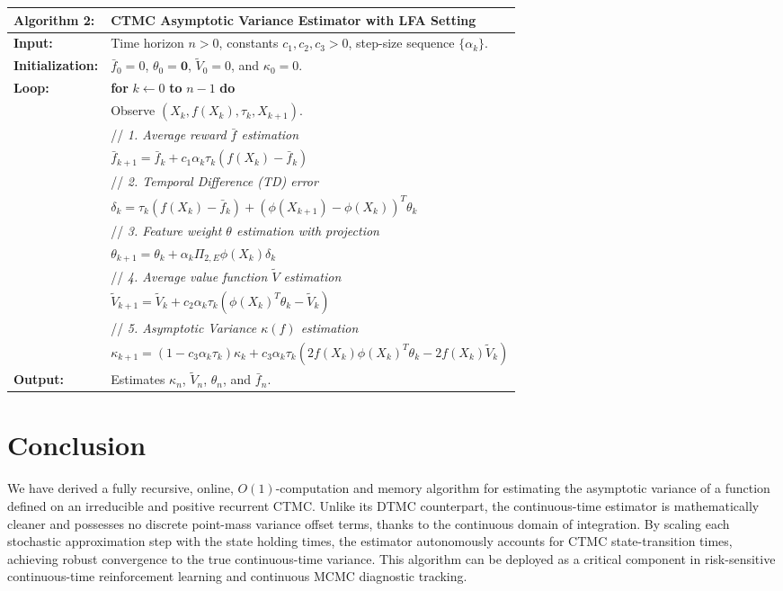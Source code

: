 \documentclass[11pt]{article}
\begin{document}
\begin{table}[H]
\centering
\begin{tabular}{lp{11cm}}
\toprule
\textbf{Algorithm 2:} & \textbf{CTMC Asymptotic Variance Estimator with LFA Setting} \\
\midrule
\textbf{Input:} & Time horizon $n > 0$, constants $c_1, c_2, c_3 > 0$, step-size sequence $\{\alpha_k\}$. \\
\textbf{Initialization:} & $\bar{f}_0 = 0$, $\theta_0 = \mathbf{0}$, $\tilde{V}_0 = 0$, and $\kappa_0 = 0$. \\
\textbf{Loop:} & \textbf{for} $k \leftarrow 0$ \textbf{to} $n-1$ \textbf{do} \\
& \quad Observe $(X_k, f(X_k), \tau_k, X_{k+1})$. \\
& \quad // \textit{1. Average reward $\bar{f}$ estimation} \\
& \quad $\bar{f}_{k+1} = \bar{f}_k + c_1 \alpha_k \tau_k (f(X_k) - \bar{f}_k)$ \\
& \quad // \textit{2. Temporal Difference (TD) error} \\
& \quad $\delta_k = \tau_k (f(X_k) - \bar{f}_k) + (\phi(X_{k+1}) - \phi(X_k))^T \theta_k$ \\
& \quad // \textit{3. Feature weight $\theta$ estimation with projection} \\
& \quad $\theta_{k+1} = \theta_k + \alpha_k \Pi_{2,E} \phi(X_k) \delta_k$ \\
& \quad // \textit{4. Average value function $\tilde{V}$ estimation} \\
& \quad $\tilde{V}_{k+1} = \tilde{V}_k + c_2 \alpha_k \tau_k (\phi(X_k)^T \theta_k - \tilde{V}_k)$ \\
& \quad // \textit{5. Asymptotic Variance $\kappa(f)$ estimation} \\
& \quad $\kappa_{k+1} = (1 - c_3 \alpha_k \tau_k) \kappa_k + c_3 \alpha_k \tau_k \left( 2f(X_k)\phi(X_k)^T\theta_k - 2f(X_k)\tilde{V}_k \right)$ \\
\textbf{Output:} & Estimates $\kappa_n$, $\tilde{V}_n$, $\theta_n$, and $\bar{f}_n$. \\
\bottomrule
\end{tabular}
\end{table}

\section{Conclusion}

We have derived a fully recursive, online, $O(1)$-computation and memory algorithm for estimating the asymptotic variance of a function defined on an irreducible and positive recurrent CTMC. Unlike its DTMC counterpart, the continuous-time estimator is mathematically cleaner and possesses no discrete point-mass variance offset terms, thanks to the continuous domain of integration. By scaling each stochastic approximation step with the state holding times, the estimator autonomously accounts for CTMC state-transition times, achieving robust convergence to the true continuous-time variance. This algorithm can be deployed as a critical component in risk-sensitive continuous-time reinforcement learning and continuous MCMC diagnostic tracking.
\end{document}
